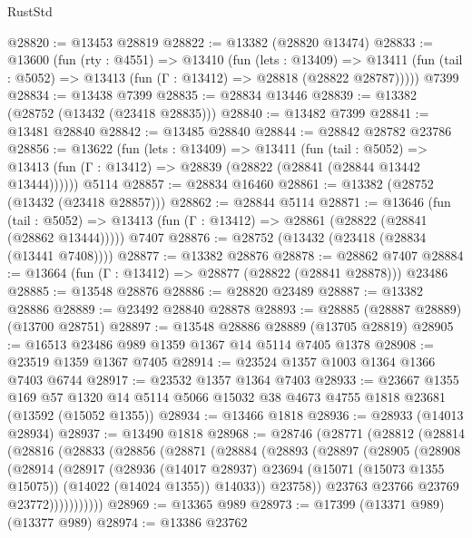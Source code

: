\begin{lexlean}{RustStd}
\begin{coremodule}
@28820 := @13453 @28819
@28822 := @13382 (@28820 @13474)
@28833 := @13600
    (fun (rty : @4551) =>
    @13410
      (fun (lets : @13409) =>
      @13411 (fun (tail : @5052) => @13413 (fun (Γ : @13412) => @28818 (@28822 @28787)))))
    @7399
@28834 := @13438 @7399
@28835 := @28834 @13446
@28839 := @13382 (@28752 (@13432 (@23418 @28835)))
@28840 := @13482 @7399
@28841 := @13481 @28840
@28842 := @13485 @28840
@28844 := @28842 @28782 @23786
@28856 := @13622
    (fun (lets : @13409) =>
    @13411
      (fun (tail : @5052) =>
      @13413 (fun (Γ : @13412) => @28839 (@28822 (@28841 (@28844 @13442 @13444))))))
    @5114
@28857 := @28834 @16460
@28861 := @13382 (@28752 (@13432 (@23418 @28857)))
@28862 := @28844 @5114
@28871 := @13646
    (fun (tail : @5052) => @13413 (fun (Γ : @13412) => @28861 (@28822 (@28841 (@28862 @13444)))))
    @7407
@28876 := @28752 (@13432 (@23418 (@28834 (@13441 @7408))))
@28877 := @13382 @28876
@28878 := @28862 @7407
@28884 := @13664 (fun (Γ : @13412) => @28877 (@28822 (@28841 @28878))) @23486
@28885 := @13548 @28876
@28886 := @28820 @23489
@28887 := @13382 @28886
@28889 := @23492 @28840 @28878
@28893 := @28885 (@28887 @28889) (@13700 @28751)
@28897 := @13548 @28886 @28889 (@13705 @28819)
@28905 := @16513 @23486 @989 @1359 @1367 @14 @5114 @7405 @1378
@28908 := @23519 @1359 @1367 @7405
@28914 := @23524 @1357 @1003 @1364 @1366 @7403 @6744
@28917 := @23532 @1357 @1364 @7403
@28933 := @23667
    @1355
    @169
    @57
    @1320
    @14
    @5114
    @5066
    @15032
    @38
    @4673
    @4755
    @1818
    @23681
    (@13592 (@15052 @1355))
@28934 := @13466 @1818
@28936 := @28933 (@14013 @28934)
@28937 := @13490 @1818
@28968 := @28746
    (@28771
      (@28812
        (@28814
          (@28816
            (@28833
              (@28856
                (@28871
                  (@28884
                    (@28893
                      (@28897
                        (@28905
                          (@28908
                            (@28914
                              (@28917
                                (@28936
                                  (@14017 @28937)
                                  @23694
                                  (@15071 (@15073 @1355 @15075))
                                  (@14022 (@14024 @1355))
                                  @14033))
                              @23758))
                          @23763
                          @23766
                          @23769
                          @23772)))))))))))
@28969 := @13365 @989
@28973 := @17399 (@13371 @989) (@13377 @989)
@28974 := @13386 @23762

\end{coremodule}
\end{lexlean}
